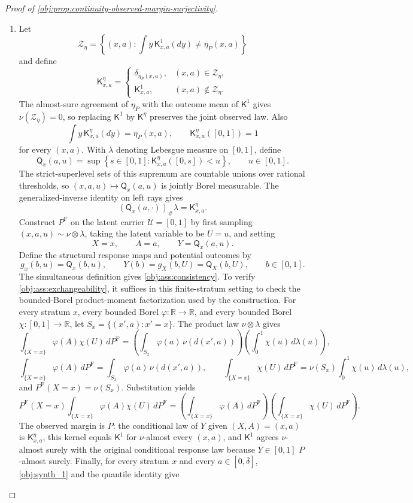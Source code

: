 \begin{proof}[Proof of \cref{obj:prop:continuity-observed-margin-surjectivity}]
\begin{enumerate}
\item Let
\[
\mathcal Z_\eta=
\left\{(x,a):\int y\,\mathsf K^1_{x,a}(dy)\ne \eta_P(x,a)\right\}
\]
and define
\[
\mathsf K^\eta_{x,a}
=
\begin{cases}
\delta_{\eta_P(x,a)}, & (x,a)\in\mathcal Z_\eta,\\
\mathsf K^1_{x,a}, & (x,a)\notin\mathcal Z_\eta .
\end{cases}
\]
The almost-sure agreement of \(\eta_P\) with the outcome mean of \(\mathsf K^1\) gives \(\nu(\mathcal Z_\eta)=0\), so replacing \(\mathsf K^1\) by \(\mathsf K^\eta\) preserves the joint observed law.  Also
\[
\int y\,\mathsf K^\eta_{x,a}(dy)=\eta_P(x,a),
\qquad
\mathsf K^\eta_{x,a}([0,1])=1
\]
for every \((x,a)\).  With \(\lambda\) denoting Lebesgue measure on \([0,1]\), define
\[
\mathsf Q_x(a,u)
=
\sup\left\{s\in[0,1]:\mathsf K^\eta_{x,a}([0,s])<u\right\},
\qquad u\in[0,1].
\]
The strict-superlevel sets of this supremum are countable unions over rational thresholds, so \((x,a,u)\mapsto\mathsf Q_x(a,u)\) is jointly Borel measurable.  The generalized-inverse identity on left rays gives
\[
(\mathsf Q_x(a,\cdot))_{\#}\lambda=\mathsf K^\eta_{x,a}.
\]
Construct \(P^{\mathrm F}\) on the latent carrier \(\mathcal U=[0,1]\) by first sampling \((x,a,u)\sim\nu\otimes\lambda\), taking the latent variable to be \(U=u\), and setting
\[
X=x,\qquad A=a,\qquad Y=\mathsf Q_x(a,u).
\]
Define the structural response maps and potential outcomes by
\[
g_x(b,u)=\mathsf Q_x(b,u),\qquad
Y(b)=g_X(b,U)=\mathsf Q_X(b,U),\qquad b\in[0,1].
\]
The simultaneous definition gives \cref{obj:ass:consistency}.  To verify \cref{obj:ass:exchangeability}, it suffices in this finite-stratum setting to check the bounded-Borel product-moment factorization used by the construction.  For every stratum \(x\), every bounded Borel \(\varphi:\mathbb R\to\mathbb R\), and every bounded Borel \(\chi:[0,1]\to\mathbb R\), let \(S_x=\{(x',a):x'=x\}\).  The product law \(\nu\otimes\lambda\) gives
\[
\int_{\{X=x\}} \varphi(A)\chi(U)\,dP^{\mathrm F}
=
\left(\int_{S_x}\varphi(a)\,\nu(d(x',a))\right)
\left(\int_0^1\chi(u)\,d\lambda(u)\right),
\]
\[
\int_{\{X=x\}} \varphi(A)\,dP^{\mathrm F}
=
\int_{S_x}\varphi(a)\,\nu(d(x',a)),
\qquad
\int_{\{X=x\}} \chi(U)\,dP^{\mathrm F}=\nu(S_x)\int_0^1\chi(u)\,d\lambda(u),
\]
and \(P^{\mathrm F}(X=x)=\nu(S_x)\).  Substitution yields
\[
P^{\mathrm F}(X=x)
\int_{\{X=x\}} \varphi(A)\chi(U)\,dP^{\mathrm F}
=
\left(\int_{\{X=x\}} \varphi(A)\,dP^{\mathrm F}\right)
\left(\int_{\{X=x\}} \chi(U)\,dP^{\mathrm F}\right).
\]
The observed margin is \(P\): the conditional law of \(Y\) given \((X,A)=(x,a)\) is \(\mathsf K^\eta_{x,a}\), this kernel equals \(\mathsf K^1\) for \(\nu\)-almost every \((x,a)\), and \(\mathsf K^1\) agrees \(\nu\)-almost surely with the original conditional response law because \(Y\in[0,1]\) \(P\)-almost surely.  Finally, for every stratum \(x\) and every \(a\in[0,\bar\delta]\), \cref{obj:synth_1} and the quantile identity give

\end{enumerate}
\end{proof}
